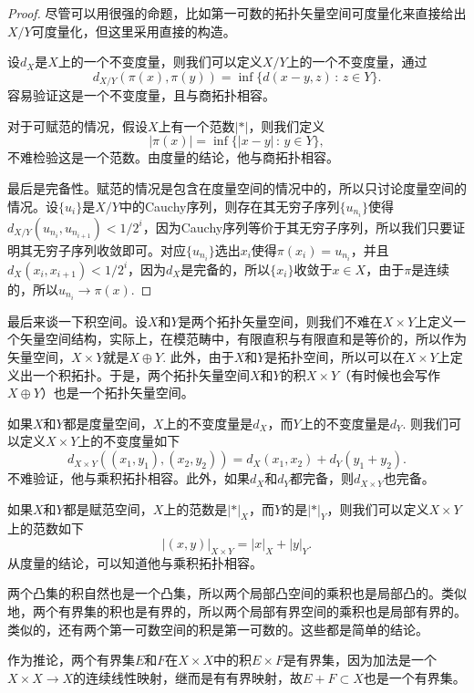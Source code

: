 \begin{proof}
	尽管可以用很强的命题，比如第一可数的拓扑矢量空间可度量化来直接给出$X/Y$可度量化，但这里采用直接的构造。

	设$d_X$是$X$上的一个不变度量，则我们可以定义$X/Y$上的一个不变度量，通过
	\[
	d_{X/Y}(\pi(x),\pi(y))=\inf\{d(x-y,z)\,:\, z\in Y\}.
	\]
	容易验证这是一个不变度量，且与商拓扑相容。

	对于可赋范的情况，假设$X$上有一个范数$|*|$，则我们定义
	\[
	|\pi(x)|=\inf\{|x-y|\,:\,y\in Y\},
	\]
	不难检验这是一个范数。由度量的结论，他与商拓扑相容。

	最后是完备性。赋范的情况是包含在度量空间的情况中的，所以只讨论度量空间的情况。设$\{u_i\}$是$X/Y$中的Cauchy序列，则存在其无穷子序列$\{u_{n_i}\}$使得$d_{X/Y}(u_{n_i},u_{n_{i+1}})<1/2^i$，因为Cauchy序列等价于其无穷子序列，所以我们只要证明其无穷子序列收敛即可。对应$\{u_{n_i}\}$选出$x_i$使得$\pi(x_i)=u_{n_i}$，并且$d_X(x_i,x_{i+1})<1/2^i$，因为$d_X$是完备的，所以$\{x_i\}$收敛于$x\in X$，由于$\pi$是连续的，所以$u_{n_i}\to \pi(x)$.
\end{proof}

\begin{para}
	最后来谈一下积空间。设$X$和$Y$是两个拓扑矢量空间，则我们不难在$X\times Y$上定义一个矢量空间结构，实际上，在模范畴中，有限直积与有限直和是等价的，所以作为矢量空间，$X\times Y$就是$X\oplus Y$. 此外，由于$X$和$Y$是拓扑空间，所以可以在$X\times Y$上定义出一个积拓扑。于是，两个拓扑矢量空间$X$和$Y$的积$X\times Y$（有时候也会写作$X\oplus Y$）也是一个拓扑矢量空间。

	如果$X$和$Y$都是度量空间，$X$上的不变度量是$d_X$，而$Y$上的不变度量是$d_Y$. 则我们可以定义$X\times Y$上的不变度量如下
	\[
	d_{X\times Y}\left((x_1,y_1),(x_2,y_2)\right)=d_X(x_1,x_2)+d_Y(y_1+y_2).
	\]
	不难验证，他与乘积拓扑相容。此外，如果$d_X$和$d_Y$都完备，则$d_{X\times Y}$也完备。

	如果$X$和$Y$都是赋范空间，$X$上的范数是$|*|_X$，而$Y$的是$|*|_Y$，则我们可以定义$X\times Y$上的范数如下
	\[
	|(x,y)|_{X\times Y}=|x|_X+|y|_Y.
	\]
	从度量的结论，可以知道他与乘积拓扑相容。

	两个凸集的积自然也是一个凸集，所以两个局部凸空间的乘积也是局部凸的。类似地，两个有界集的积也是有界的，所以两个局部有界空间的乘积也是局部有界的。类似的，还有两个第一可数空间的积是第一可数的。这些都是简单的结论。

	作为推论，两个有界集$E$和$F$在$X\times X$中的积$E\times F$是有界集，因为加法是一个$X\times X\to X$的连续线性映射，继而是有有界映射，故$E+F\subset X$也是一个有界集。
\end{para}

